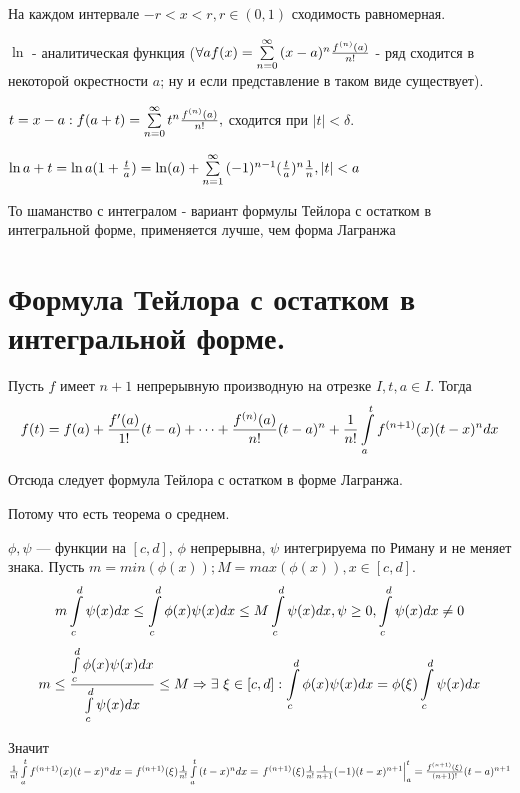 \documentclass[12pt]{report}
\begin{document}
\begin{note}
На каждом интервале $-r < x < r, r \in (0, 1)$ сходимость равномерная.
\end{note}

\begin{note}[2]
$\ln$ - аналитическая функция ($\forall a f(x) = \sum\limits_{n = 0}^\infty{(x - a)^n\frac{f^{(n)}(a)}{n!}}$ - ряд сходится в некоторой окрестности $a$; ну и если представление в таком виде существует).

$t = x - a: f(a + t) = \sum\limits_{n = 0}^\infty{t^n\frac{f^{(n)}(a)}{n!}},$ сходится при $|t| < \delta$.

$\ln{a + t} = \ln{a(1 + \frac{t}{a})} = \ln(a) + \sum\limits_{n = 1}^\infty{(-1)^{n - 1}(\frac{t}{a})^n \frac{1}{n}}, |t| < a$
\end{note}

\begin{rem}
То шаманство с интегралом - вариант формулы Тейлора с остатком в интегральной форме, применяется лучше, чем форма Лагранжа
\end{rem}

\section{Формула Тейлора с остатком в интегральной форме.}

\begin{thm}
Пусть $f$ имеет $n + 1$ непрерывную производную на отрезке $I, t, a \in I$. Тогда
$$f(t) = f(a) + \frac{f'(a)}{1!}(t - a) + \dots + \frac{f^{(n)}(a)}{n!}(t - a)^n + \frac{1}{n!}\int\limits_a^t{f^{(n + 1)}(x)(t - x)^n dx}$$
\end{thm}

\begin{note}
Отсюда следует формула Тейлора с остатком в форме Лагранжа.

Потому что есть теорема о среднем.

$\phi, \psi$ --- функции на $[c, d]$, $\phi$ непрерывна, $\psi$ интегрируема по Риману и не меняет знака. Пусть $m = min(\phi(x)); M = max(\phi(x)), x \in [c, d]$.
$$m\int\limits_c^d{\psi(x)dx} \le \int\limits_c^d{\phi(x)\psi(x)dx} \le M\int\limits_c^d{\psi(x)dx}, \psi \ge 0, \int\limits_c^d{\psi(x)dx} \neq 0$$
$$m \le \frac{\int\limits_c^d{\phi(x)\psi(x)dx}}{\int\limits_c^d{\psi(x)dx}} \le M \Rightarrow \exists ~\xi \in [c, d]: \int\limits_c^d{\phi(x)\psi(x)dx} = \phi(\xi)\int\limits_c^d{\psi(x)dx}$$

Значит $\frac{1}{n!}\int\limits_a^t{f^{(n + 1)}(x)(t - x)^ndx} = f^{(n + 1)}(\xi)\frac{1}{n!}\int\limits_a^t{(t - x)^ndx} = \left.f^{(n + 1)}(\xi)\frac{1}{n!}\frac{1}{n + 1}(-1)(t - x)^{n + 1}\right|_a^t = \frac{f^{(n + 1)}(\xi)}{(n + 1)!}(t - a)^{n + 1}$
\end{note}
\end{document}
